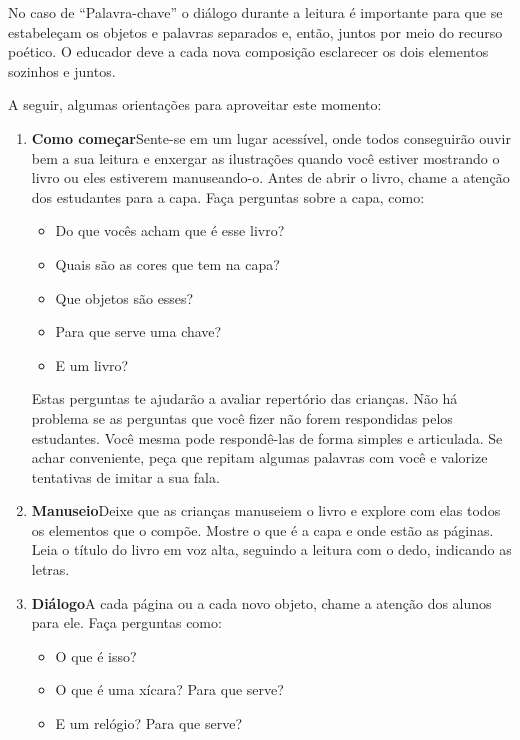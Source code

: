 \documentclass[11pt]{extarticle}
\begin{document}
\begin{enumerate}
No caso de ``Palavra-chave'' o diálogo durante a leitura é 
importante para que se estabeleçam os objetos e palavras separados
e, então, juntos por meio do recurso poético. O educador
deve a cada nova composição esclarecer os dois elementos
sozinhos e juntos.

A seguir, algumas orientações para aproveitar este momento: 

\begin{enumerate}
\item \textbf{Como começar}\quad Sente-se em um lugar acessível, 
onde todos conseguirão ouvir bem a sua leitura e enxergar as ilustrações 
quando você estiver mostrando o livro ou eles estiverem manuseando-o. 
Antes de abrir o livro, chame a atenção dos estudantes para a capa. 
Faça perguntas sobre a capa, como: 

\begin{itemize}
\item Do que vocês acham que é esse livro?
\item Quais são as cores que tem na capa?
\item Que objetos são esses?
\item Para que serve uma chave?
\item E um livro?
\end{itemize}

Estas perguntas te ajudarão a avaliar repertório das crianças. 
Não há problema se as perguntas que você fizer não forem respondidas pelos 
estudantes. Você mesma pode respondê-las de forma simples e articulada. Se achar 
conveniente, peça que repitam algumas palavras com você e valorize tentativas 
de imitar a sua fala. 
 
\item \textbf{Manuseio}\quad Deixe que as crianças manuseiem o livro 
e explore com elas todos os elementos que o compõe. Mostre o que é a 
capa e onde estão as páginas. Leia o título do livro em voz alta, seguindo 
a leitura com o dedo, indicando as letras. 

\item \textbf{Diálogo}\quad A cada página ou a cada novo objeto,
chame a atenção dos alunos para ele. Faça perguntas como:

\begin{itemize}
\item O que é isso?
\item O que é uma xícara? Para que serve?
\item E um relógio? Para que serve?
\end{itemize}


\end{enumerate}
\end{enumerate}
\end{document}
